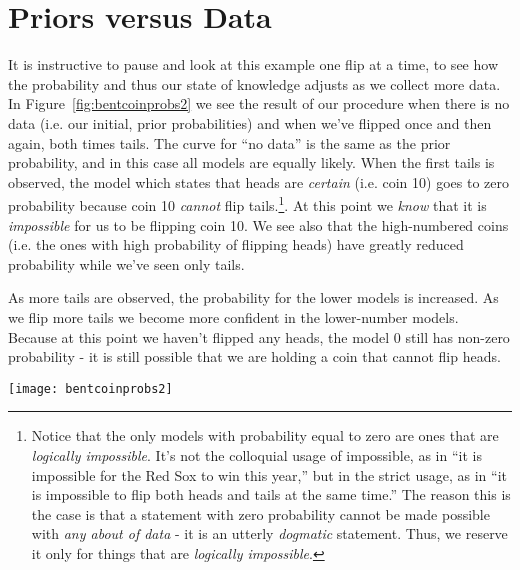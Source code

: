 \section{Priors versus Data}

It is instructive to pause and look at this example one flip at a time, to see how the probability and thus our state of knowledge adjusts as we collect more data.  In Figure~\ref{fig:bentcoinprobs2} we see the result of our procedure when there is no data (i.e. our initial, prior probabilities) and when we've flipped once and then again, both times tails.  The curve for ``no data'' is the same as the prior probability, and in this case all models are equally likely.  When the first tails is observed, the model which states that heads are {\em certain} (i.e. coin 10) goes to zero probability because coin 10 \emph{cannot} flip tails.\footnote{Notice that the only models with probability equal to zero are ones that are \emph{logically impossible}.  It's not the colloquial usage of impossible, as in ``it is impossible for the Red Sox to win this year,'' but in the strict usage, as in ``it is impossible to flip both heads and tails at the same time.''  The reason this is the case is that a statement with zero probability cannot be made possible with \emph{any about of data} - it is an utterly \emph{dogmatic} statement.  Thus, we reserve it only for things that are \emph{logically impossible}.
}.  At this point we {\em know} that it is {\em impossible} for us to be flipping coin 10.  We see also that the high-numbered coins (i.e. the ones with high probability of flipping heads) have greatly reduced probability while we've seen only tails.

As more tails are observed, the probability for the lower models is increased.  As we flip more tails we become more confident in the lower-number models.  Because at this point we haven't flipped any heads, the model 0 still has non-zero probability - it is still possible that we are holding a coin that cannot flip heads.

\begin{figure*}
\texttt{[image: bentcoinprobs2]}
\label{fig:bentcoinprobs2}
\caption{Probability for different bent-coin models, given no data (left), the first tails (middle), and the second tails (right).  The curve for no data is the same as the prior probability, and in this case all models are equally likely.  When the first tails is observed, the model which states that heads are {\em certain} (coin 10) goes to zero probability.  As more tails are observed, the probability for the lower models is increased.}
\end{figure*}

